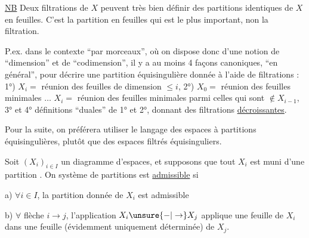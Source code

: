 \uline{NB} Deux filtrations  de $X$ peuvent très bien définir des  partitions identiques de $X$ en feuilles. C'est la partition en feuilles qui est le plus important, non la filtration.

P.ex. dans le contexte ``par morceaux'', où on dispose donc d'une notion de ``dimension'' et de ``codimension'', il y a au moins 4 façons canoniques,  ``en général'', pour décrire une partition équisingulière donnée à l'aide de filtrations : 1°) $X_i =$ réunion des feuilles de dimension $\leq i$, 2°) $X_0 =$ réunion des feuilles minimales $\ldots$ $X_i =$ réunion des feuilles minimales parmi celles qui sont $\notin X_{i-1}$, 3° et 4° définitions ``duales'' de 1° et 2°, donnant des filtrations \uline{décroissantes}.

Pour la suite, on préférera utiliser le langage des espaces à partitions équisingulières, plutôt que des espaces filtrés équisinguliers.


Soit $(X_i)_{i\in I}$ un diagramme d'espaces, et supposons que tout $X_i$ est muni d'une partition . On  système  de partitions est \uline{admissible} si

a) $\forall i\in I$, la partition donnée de $X_i$ est admissible

b) $\forall$ flèche $i\to j$, l'application $X_i\unsure{-|\to}X_j$ applique une feuille de $X_i$ dans une feuille (évidemment uniquement déterminée) de $X_j$.
